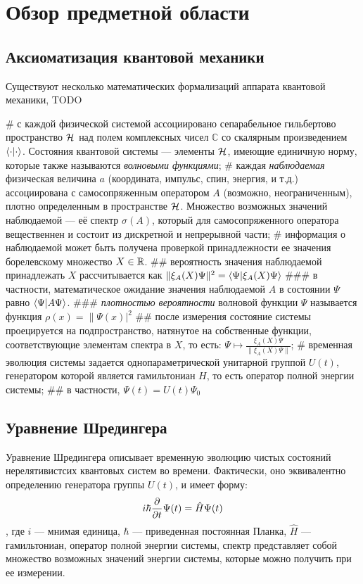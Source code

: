 \chapter{Обзор предметной области}
\label{chapter1}

\section{Аксиоматизация квантовой механики}


Существуют несколько математических формализаций аппарата квантовой механики, TODO

\begin{easylist}[itemize]
# с каждой физической системой ассоциировано сепарабельное гильбертово пространство $\mathcal{H}_{}$ над полем комплексных чисел $\mathbb{C}$ со скалярным произведением $\ip{\cdot}{\cdot}$. Состояния квантовой системы — элементы $\mathcal{H}_{}$, имеющие единичную норму, которые также называются \textit{волновыми функциями};
# каждая \textit{наблюдаемая} физическая величина $a$ (координата, импульс, спин, энергия, и т.д.) ассоциирована с самосопряженным оператором $A$ (возможно, неограниченным), плотно определенным в пространстве $\mathcal{H}_{}$. Множество возможных значений наблюдаемой — её спектр $\sigma(A)$, который для самосопряженного оператора вещественнен и состоит из дискретной и непрерывной части;
# информация о наблюдаемой может быть получена проверкой принадлежности ее значения борелевскому множество $X \in \mathbb{R}$.
## вероятность значения наблюдаемой принадлежать $X$ рассчитывается как $\| \xi_A(X) \Psi \|^2 = \ip{\Psi}{\xi_A(X) \Psi}$
### в частности, математическое ожидание значения наблюдаемой $A$ в состоянии $\Psi$ равно $\ip{\Psi}{A \Psi}$.
### \textit{плотностью вероятности} волновой функции $\Psi$ называется функция $\rho(x) = \|\Psi(x)|^2$ 
## после измерения состояние системы проецируется на подпространство, натянутое на собственные функции, соответствующие элементам спектра в $X$, то есть: $\Psi \mapsto \frac{\xi_A(X) \Psi}{\| \xi_A(X) \Psi \|}$;
# временная эволюция системы задается однопараметрической унитарной группой $U(t)$, генератором которой является гамильтониан $H$, то есть оператор полной энергии системы;
## в частности, $\Psi(t) = U(t) \Psi_0$
\end{easylist}

\section{Уравнение Шредингера}
Уравнение Шредингера описывает временную эволюцию чистых состояний нерелятивистсих квантовых систем во времени. Фактически, оно эквивалентно определению генератора группы $U(t)$, и имеет форму:
\[
i \hbar \pdv{t} \Psi(t) = \hat{H} \Psi(t)
\]
, где $i$ — мнимая единица, $\hbar$ — приведенная постоянная Планка, $\hat{H}$ — гамильтониан, оператор полной энергии системы, спектр представляет собой множество возможных значений энергии системы, которые можно получить при ее измерении.

